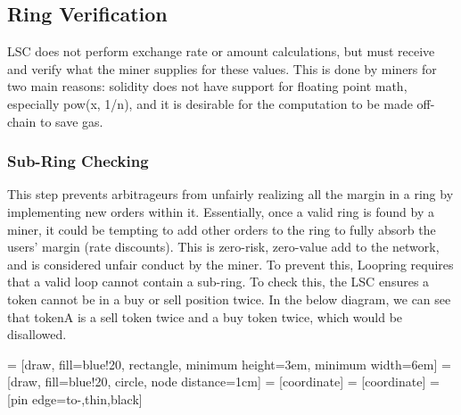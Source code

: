 \documentclass[UTF8,nofonts]{article}
\makeatletter
\newenvironment{figurehere}
 {\def\@captype{figure}}
 {}
\makeatother
\begin{document}
\begin{multicols}{2}
\subsection{Ring Verification\label{sec:ring_verification}}

LSC does not perform exchange rate or amount calculations, but must receive and verify what the miner supplies for these values. This is done by miners for two main reasons: solidity does not have support for floating point math, especially pow(x, 1/n), and it is desirable for the computation to be made off-chain to save gas.

\subsubsection{Sub-Ring Checking\label{sec:sub_ring_check}}
This step prevents arbitrageurs from unfairly realizing all the margin in a ring by implementing new orders within it. Essentially, once a valid ring is found by a miner, it could be tempting to add other orders to the ring to fully absorb the users' margin (rate discounts). This is zero-risk, zero-value add to the network, and is considered unfair conduct by the miner. To prevent this, Loopring requires that a valid loop cannot contain a sub-ring. To check this, the LSC ensures a token cannot be in a buy or sell position twice. In the below diagram, we can see that tokenA is a sell token twice and a buy token twice, which would be disallowed. 

\begin{center}
\begin{figurehere}
\centering
{} = [draw, fill=blue!20, rectangle, 
    minimum height=3em, minimum width=6em]
 = [draw, fill=blue!20, circle, node distance=1cm]
 = [coordinate]
 = [coordinate]
 = [pin edge={to-,thin,black}]

\end{figurehere}
\end{center}
\end{multicols}
\end{document}
